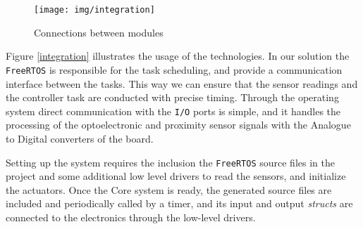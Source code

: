 \begin{figure}[H]
    \centering
    \texttt{[image: img/integration]}
    \caption{Connections between modules}
    \label{fig:integration}
\end{figure}

Figure \ref{integration}  illustrates the usage of the technologies. In our solution the \texttt{FreeRTOS} is responsible for the task scheduling, and provide a communication interface between the tasks. This way we can ensure that the sensor readings and the controller task are conducted with precise timing. Through the operating system direct communication with the \texttt{I/O} ports is simple, and it handles the processing of the optoelectronic and proximity sensor signals with the Analogue to Digital converters of the board.

Setting up the system requires the inclusion the \texttt{FreeRTOS} source files in the project and some additional low level drivers to read the sensors, and initialize the actuators. Once the Core system is ready, the generated source files are included and periodically called by a timer, and its input and output \emph{structs} are connected to the electronics through the low-level drivers.